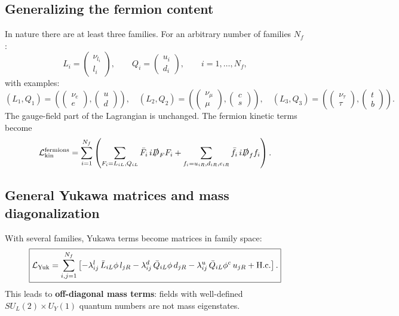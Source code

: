 \subsection{Generalizing the fermion content}
In nature there are at least three families. For an arbitrary number of families $N_f$:
\begin{equation}
L_i=\begin{pmatrix}\nu_{l_i}\\ l_i\end{pmatrix},
\qquad
Q_i=\begin{pmatrix}u_i\\ d_i\end{pmatrix},
\qquad i=1,\dots,N_f,
\end{equation}
with examples:
\[
(L_1,Q_1)=\left(\begin{pmatrix}\nu_e\\ e\end{pmatrix},\begin{pmatrix}u\\ d\end{pmatrix}\right),\quad
(L_2,Q_2)=\left(\begin{pmatrix}\nu_\mu\\ \mu\end{pmatrix},\begin{pmatrix}c\\ s\end{pmatrix}\right),\quad
(L_3,Q_3)=\left(\begin{pmatrix}\nu_\tau\\ \tau\end{pmatrix},\begin{pmatrix}t\\ b\end{pmatrix}\right).
\]
The gauge-field part of the Lagrangian is unchanged. The fermion kinetic terms become
\begin{equation}
\mathcal L_{\rm kin}^{\rm fermions}
=
\sum_{i=1}^{N_f}\left(
\sum_{F_i=L_{iL},Q_{iL}}\bar F_i\,i\slashed{D}_F F_i
+\sum_{f_i=u_{iR},d_{iR},e_{iR}}\bar f_i\,i\slashed{D}_f f_i
\right).
\end{equation}

\subsection{General Yukawa matrices and mass diagonalization}
With several families, Yukawa terms become matrices in family space:
\begin{equation}
\boxed{
\mathcal L_{\rm Yuk}
=
\sum_{i,j=1}^{N_f}\left[
-\lambda^{l}_{ij}\,\bar L_{iL}\phi\,l_{jR}
-\lambda^{d}_{ij}\,\bar Q_{iL}\phi\,d_{jR}
-\lambda^{u}_{ij}\,\bar Q_{iL}\phi^c\,u_{jR}
+\mathrm{H.c.}
\right].
}
\label{eq:Yukawa-matrix}
\end{equation}
This leads to \textbf{off-diagonal mass terms}: fields with well-defined $SU_L(2)\times U_Y(1)$ quantum numbers are not mass eigenstates.

